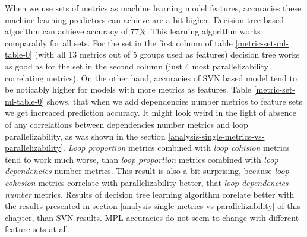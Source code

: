 \null\qquad When we use sets of metrics as machine learning model features, accuracies these machine learning predictors can achieve are a bit higher. Decision tree based algorithm can achieve accuracy of 77\%. This learning algorithm works comparably for all sets. For the set in the first column of table \ref{metric-set-ml-table-0} (with all 13 metrics out of 5 groups used as features) decision tree works as good as for the set in the second column (just 4 most parallelizability correlating metrics). On the other hand, accuracies of SVN based model tend to be noticably higher for models with more metrics as features. Table \ref{metric-set-ml-table-0} shows, that when we add dependencies number metrics to feature sets we get increaced prediction accuracy. It might look weird in the light of absence of any correlations between dependencies number metrics and loop parallelizability, as was shown in the section \ref{analysis-single-metrics-vs-parallelizability}. \textit{Loop proportion} metrics combined with \textit{loop cohision} metrics tend to work much worse, than \textit{loop proportion} metrics combined with \textit{loop dependencies} number metrics. This result is also a bit surprising, because \textit{loop cohesion} metrics correlate with parallelizability better, that \textit{loop dependencies number} metrics.\newline
\null\qquad Results of decision tree learning algorithm corelate better with the results presented in section \ref{analysis-single-metrics-vs-parallelizability} of this chapter, than SVN results. MPL accuracies do not seem to change with different feature sets at all.  
          